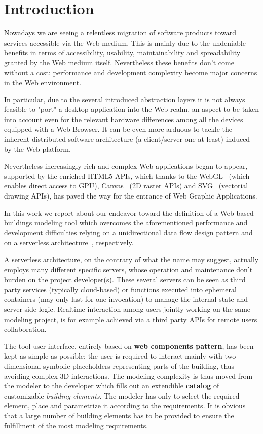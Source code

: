 \section{Introduction}\label{sec:introduction}

Nowadays we are seeing a relentless migration of software products toward services accessible via the Web medium. This is mainly due to the undeniable benefits in terms of accessibility, usability, maintainability and spreadability granted by the Web medium itself. Nevertheless these benefits don't come without a cost: performance  and development complexity become major concerns in the Web environment. 

In particular, due to the several introduced abstraction layers it is not always feasible to "port" a desktop application into the Web realm, an aspect to be taken into account even for the relevant hardware differences among all the devices equipped with a Web Browser. It can be even more arduous to tackle the inherent distributed software architecture (a client/server one at least) induced by the Web platform.

Nevertheless increasingly rich and complex Web applications began to appear, supported by the enriched HTML5 APIs, which thanks to the WebGL~\cite{webgl} (which enables direct access to GPU), Canvas~\cite{Munro:15:HCC} (2D raster APIs) and SVG~\cite{Jackson:11:SVG} (vectorial drawing APIs), has paved the way for the entrance of Web Graphic Applications.

In this work we report about our endeavor toward the definition of a Web based buildings modeling tool which overcomes the aforementioned performance and development difficulties relying on a unidirectional data flow design pattern and on a serverless architecture~\cite{Roberts}, respectively.

A serverless architecture, on the contrary of what the name may suggest, actually employs many different specific servers, whose operation and maintenance don't burden on the project developer(s). These several servers can be seen as third party services (typically cloud-based) or functions executed into ephemeral containers (may only last for one invocation) to manage the internal state and server-side logic. Realtime interaction among users jointly working on the same modeling project, is for example achieved via a third party APIs for remote users collaboration.

The tool user interface, entirely based on \textbf{web components pattern},  has been kept as simple as possible: the user is required to interact mainly with two-dimensional symbolic placeholders representing parts of the building, thus avoiding complex 3D interactions. 
The modeling complexity is thus moved from the modeler to the developer which fills out an extendible \textbf{catalog} of customizable \textit{building elements}. The modeler has only to select the required element, place and parametrize it according to the requirements. It is obvious that a large number of building elements has to be provided to ensure the fulfillment of the most modeling requirements.

